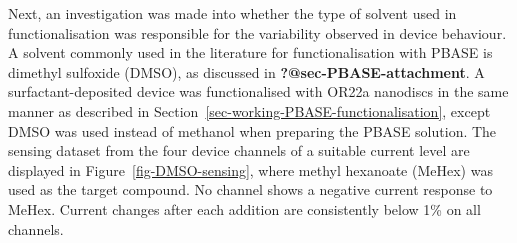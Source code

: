 \documentclass[
  a4paper,
]{scrbook}
\begin{document}
Next, an investigation was made into whether the type of solvent used in
functionalisation was responsible for the variability observed in device
behaviour. A solvent commonly used in the literature for
functionalisation with PBASE is dimethyl sulfoxide (DMSO), as discussed
in \textbf{?@sec-PBASE-attachment}. A surfactant-deposited device was
functionalised with OR22a nanodiscs in the same manner as described in
Section~\ref{sec-working-PBASE-functionalisation}, except DMSO was used
instead of methanol when preparing the PBASE solution. The sensing
dataset from the four device channels of a suitable current level are
displayed in Figure~\ref{fig-DMSO-sensing}, where methyl hexanoate
(MeHex) was used as the target compound. No channel shows a negative
current response to MeHex. Current changes after each addition are
consistently below 1\% on all channels.
\end{document}
